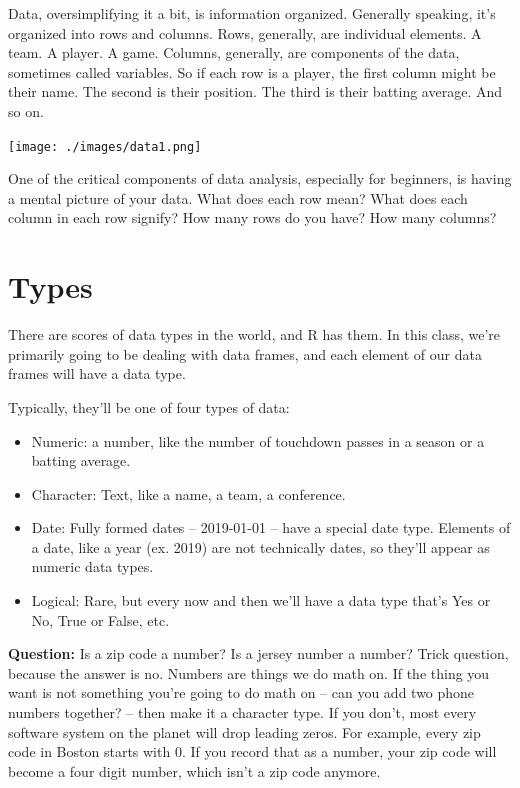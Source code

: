 \documentclass[
  letterpaper,
  DIV=11,
  numbers=noendperiod]{scrreprt}
\providecommand{\tightlist}{%
  \setlength{\itemsep}{0pt}\setlength{\parskip}{0pt}}\usepackage{longtable,booktabs,array}
\begin{document}
Data, oversimplifying it a bit, is information organized. Generally
speaking, it's organized into rows and columns. Rows, generally, are
individual elements. A team. A player. A game. Columns, generally, are
components of the data, sometimes called variables. So if each row is a
player, the first column might be their name. The second is their
position. The third is their batting average. And so on.

\texttt{[image: ./images/data1.png]}

One of the critical components of data analysis, especially for
beginners, is having a mental picture of your data. What does each row
mean? What does each column in each row signify? How many rows do you
have? How many columns?

\hypertarget{types}{%
\section{Types}\label{types}}

There are scores of data types in the world, and R has them. In this
class, we're primarily going to be dealing with data frames, and each
element of our data frames will have a data type.

Typically, they'll be one of four types of data:

\begin{itemize}
\tightlist
\item
  Numeric: a number, like the number of touchdown passes in a season or
  a batting average.
\item
  Character: Text, like a name, a team, a conference.
\item
  Date: Fully formed dates -- 2019-01-01 -- have a special date type.
  Elements of a date, like a year (ex. 2019) are not technically dates,
  so they'll appear as numeric data types.
\item
  Logical: Rare, but every now and then we'll have a data type that's
  Yes or No, True or False, etc.
\end{itemize}

\textbf{Question:} Is a zip code a number? Is a jersey number a number?
Trick question, because the answer is no. Numbers are things we do math
on. If the thing you want is not something you're going to do math on --
can you add two phone numbers together? -- then make it a character
type. If you don't, most every software system on the planet will drop
leading zeros. For example, every zip code in Boston starts with 0. If
you record that as a number, your zip code will become a four digit
number, which isn't a zip code anymore.
\end{document}
